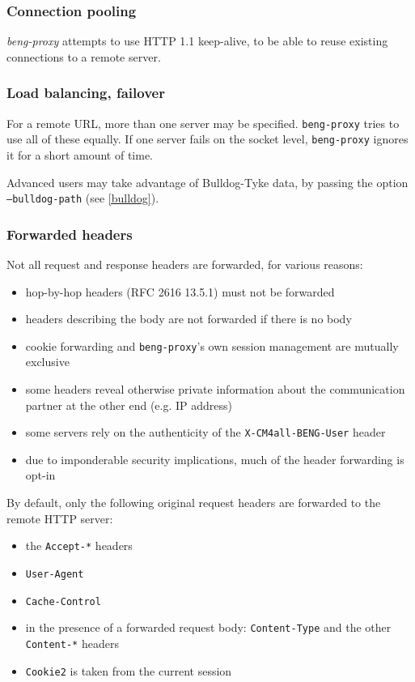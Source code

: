 \documentclass[a4paper,12pt]{article}
\begin{document}
\subsubsection{Connection pooling}

\emph{beng-proxy} attempts to use HTTP 1.1 keep-alive, to be able to
reuse existing connections to a remote server.

\subsubsection{Load balancing, failover}
\label{balancing}

For a remote URL, more than one server may be specified.
\texttt{beng-proxy} tries to use all of these equally.  If one server
fails on the socket level, \texttt{beng-proxy} ignores it for a short
amount of time.

Advanced users may take advantage of Bulldog-Tyke data, by passing
the option \texttt{--bulldog-path} (see \ref{bulldog}).

\subsubsection{Forwarded headers}

Not all request and response headers are forwarded, for various
reasons:

\begin{itemize}
\item hop-by-hop headers (RFC 2616 13.5.1) must not be forwarded
\item headers describing the body are not forwarded if there is no
  body
\item cookie forwarding and \texttt{beng-proxy}'s own session
  management are mutually exclusive
\item some headers reveal otherwise private information about the
  communication partner at the other end (e.g. IP address)
\item some servers rely on the authenticity of the
  \texttt{X-CM4all-BENG-User} header
\item due to imponderable security implications, much of the header
  forwarding is opt-in
\end{itemize}

By default, only the following original request headers are forwarded
to the remote HTTP server:

\begin{itemize}
\item the \texttt{Accept-*} headers
\item \texttt{User-Agent}
\item \texttt{Cache-Control}
\item in the presence of a forwarded request body:
  \texttt{Content-Type} and the other \texttt{Content-*} headers
\item \texttt{Cookie2} is taken from the current session
\end{itemize}
\end{document}
